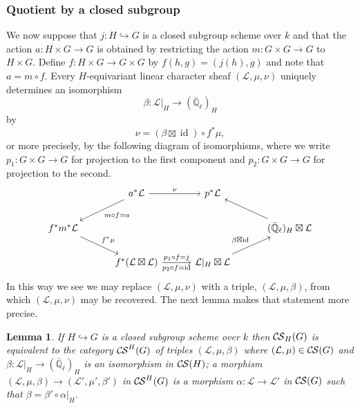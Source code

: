 \documentclass[10pt]{amsart}
\theoremstyle{plain}
\newtheorem{lemma}[theorem]{Lemma}
\theoremstyle{definition}
\newcommand{\EE}{\mathbb{\bar Q}_\ell}
\newcommand{\Fq}{k}
\DeclareMathOperator{\id}{id}
\newcommand{\cs}[1]{{\mathcal{#1}}}
\newcommand{\CS}{{\mathcal{C\hskip-0.8pt S}}}
\begin{document}
\subsubsection{Quotient by a closed subgroup}\label{ssec:closed}

We now suppose that $j : H \hookrightarrow G$ is a closed subgroup scheme over $\Fq$ and that the action $a : H\times G\to G$ is obtained by restricting the action $m : G \times G\to G$ to $H\times G$.
Define $f : H\times G \to G\times G$ by $f(h,g) = (j(h),g)$ and note that $a = m\circ f$.
Every $H$-equivariant linear character sheaf $(\cs{L},\mu, \nu)$ uniquely determines an isomorphism 
\[
\beta : \cs{L}\vert_H \to (\EE)_{H}
\]
by 
\begin{equation}\label{betanu}
\nu = (\beta \boxtimes \id) \circ  f^*\mu,
\end{equation}
or more precisely, by the following diagram of isomorphisms, where we write $p_1: G\times G\to G$ for projection to the first component and $p_2 : G\times G \to G$ for projection to the second.
\[
\begin{tikzcd}[column sep=30]
\ & a^*\cs{L} \arrow{dl}{m\circ f = a} \arrow{r}{\nu} & p^*\cs{L} & \\
f^* m^*\cs{L} \arrow{dr}{f^*\mu} &&& (\EE)_{H} \boxtimes \cs{L} \arrow{ul} \\ 
& f^*(\cs{L}\boxtimes \cs{L}) \arrow{r}{p_1 \circ f = j}[swap]{p_2\circ f = \id}  & 
\cs{L}\vert_{H} \boxtimes \cs{L} \arrow{ur}{\beta\boxtimes \id} & 
\end{tikzcd}
\]
In this way we see we may replace $(\cs{L},\mu,\nu)$ with a triple, $(\cs{L},\mu,\beta)$, from which $(\cs{L},\mu,\nu)$ may be recovered.
The next lemma makes that statement more precise.


\begin{lemma}\label{lem:beta}
If $H\hookrightarrow G$ is a closed subgroup scheme over $\Fq$ then
$\CS_H(G)$ is equivalent to the category $\CS^H(G)$ of triples $(\cs{L},\mu,\beta)$ where $(\cs{L},\mu)\in \CS(G)$ and $\beta : \cs{L}\vert_H \to (\EE)_H$ is an isomorphism in $\CS(H)$; a morphism $(\cs{L},\mu,\beta) \to (\cs{L}',\mu',\beta')$ in $\CS^H(G)$ is a morphism $\alpha: \cs{L} \to \cs{L}'$ in $\CS(G)$ such that $\beta = \beta' \circ \alpha\vert_{H}$.
\end{lemma}
\end{document}
